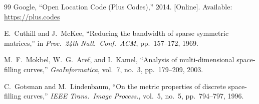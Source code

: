 \documentclass[11pt,a4paper]{article}
\theoremstyle{plain}
\theoremstyle{definition}
\theoremstyle{remark}
\begin{document}
\begin{thebibliography}{99}
Google, ``Open Location Code (Plus Codes),'' 2014. [Online]. Available:
\url{https://plus.codes}

E.~Cuthill and J.~McKee, ``Reducing the bandwidth of sparse symmetric
matrices,'' in \emph{Proc.\ 24th Natl.\ Conf.\ ACM}, pp.~157--172, 1969.

M.~F.~Mokbel, W.~G.~Aref, and I.~Kamel, ``Analysis of multi-dimensional
space-filling curves,'' \emph{GeoInformatica}, vol.~7, no.~3,
pp.~179--209, 2003.

C.~Gotsman and M.~Lindenbaum, ``On the metric properties of discrete
space-filling curves,'' \emph{IEEE Trans.\ Image Process.},
vol.~5, no.~5, pp.~794--797, 1996.

\end{thebibliography}
\end{document}
